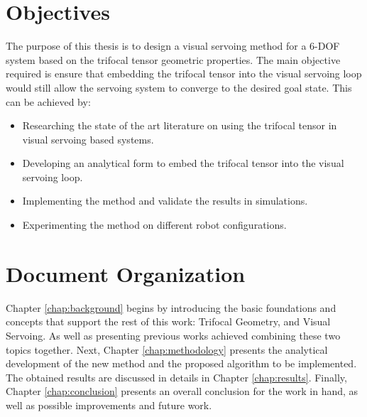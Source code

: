 \section{Objectives}
The purpose of this thesis is to design a visual servoing method for a 6-DOF system based on the trifocal tensor geometric properties. The main objective required is ensure that embedding the trifocal tensor into the visual servoing loop would still allow the servoing system to converge to the desired goal state. This can be achieved by:
\begin{itemize}
  \item Researching the state of the art literature on using the trifocal tensor in visual servoing based systems.
  \item Developing an analytical form to embed the trifocal tensor into the visual servoing loop.
  \item Implementing the method and validate the results in simulations.
  \item Experimenting the method on different robot configurations.
\end{itemize}

\section{Document Organization}
Chapter \ref{chap:background} begins by introducing the basic foundations and concepts that support the rest of this work: Trifocal Geometry, and Visual Servoing. As well as presenting previous works achieved combining these two topics together.
Next, Chapter \ref{chap:methodology} presents the analytical development of the new method and the proposed algorithm to be implemented. The obtained results are discussed in details in Chapter \ref{chap:results}. Finally, Chapter \ref{chap:conclusion} presents an overall conclusion for the work in hand, as well as possible improvements and future work.
